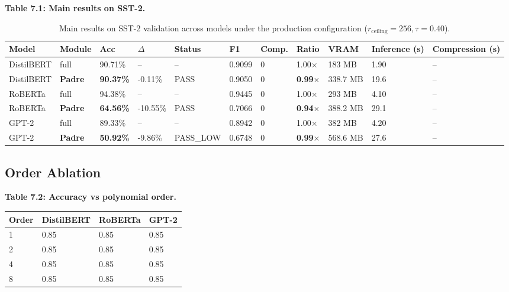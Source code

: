 \textbf{Table 7.1: Main results on SST-2.}

\begin{table}[t]
\centering
\small
\begin{tabular}{lllllllllll}
\toprule
\textbf{Model} & \textbf{Module} & \textbf{Acc} & \textbf{$\Delta$} & \textbf{Status} & \textbf{F1} & \textbf{Comp.} & \textbf{Ratio} & \textbf{VRAM} & \textbf{Inference (s)} & \textbf{Compression (s)} \\
\midrule
DistilBERT & full & 90.71\% & -- & -- & 0.9099 & 0 & 1.00$\times$ & 183 MB & 1.90 & -- \\
DistilBERT & \textbf{Padre} & \textbf{90.37\%} & -0.11\% & PASS & 0.9050 & 0 & \textbf{0.99$\times$} & 338.7 MB & 19.6 & -- \\
RoBERTa & full & 94.38\% & -- & -- & 0.9445 & 0 & 1.00$\times$ & 293 MB & 4.10 & -- \\
RoBERTa & \textbf{Padre} & \textbf{64.56\%} & -10.55\% & PASS & 0.7066 & 0 & \textbf{0.94$\times$} & 388.2 MB & 29.1 & -- \\
GPT-2 & full & 89.33\% & -- & -- & 0.8942 & 0 & 1.00$\times$ & 382 MB & 4.20 & -- \\
GPT-2 & \textbf{Padre} & \textbf{50.92\%} & -9.86\% & PASS\_LOW & 0.6748 & 0 & \textbf{0.99$\times$} & 568.6 MB & 27.6 & -- \\
\bottomrule
\end{tabular}
\caption{Main results on SST-2 validation across models under the production configuration ($r_{\mathrm{ceiling}}=256, \tau=0.40$).}
\label{tab:main_sst2}
\end{table}

\subsection{Order Ablation}

\textbf{Table 7.2: Accuracy vs polynomial order.}

\begin{table}[H]
\centering
\small
\begin{tabular}{llll}
\toprule
\textbf{Order} & \textbf{DistilBERT} & \textbf{RoBERTa} & \textbf{GPT-2} \\
\midrule
1 & 0.85 & 0.85 & 0.85 \\
2 & 0.85 & 0.85 & 0.85 \\
4 & 0.85 & 0.85 & 0.85 \\
8 & 0.85 & 0.85 & 0.85 \\
\bottomrule
\end{tabular}
\end{table}

